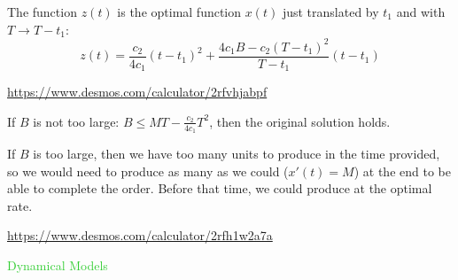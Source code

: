 \documentclass{workbook}
\begin{document}
\begin{solution}
\begin{slide}
\begin{parts}
	The function $z(t)$ is the optimal function $x(t)$ just translated by $t_1$ and with $T \to T-t_1$:
		\[ 
			z(t) = \frac{c_2}{4c_1} (t-t_1)^2 + \frac{4c_1 B-c_2 (T-t_1)^2}{T-t_1} (t-t_1)
		\]

	\url{https://www.desmos.com/calculator/2rfvhjabpf}
	
	\item If $B$ is not too large: $B\leq MT-\frac{c_{2}}{4c_{1}}T^{2}$, then the original solution holds.
		
		If $B$ is too large, then we have too many units to produce in the time provided, so we would need to produce as many as we could ($x'(t)=M$) at the end to be able to complete the order. 
		Before that time, we could produce at the optimal rate.

		\url{https://www.desmos.com/calculator/2rfh1w2a7a}
	
\end{parts}
\end{slide}
\end{solution}







%
%
%
%

\begin{slide}
\question

\begin{slidesonly}
	\vspace{3cm}
\end{slidesonly}

\begin{center}
\Huge 
\textcolor{LimeGreen}{Dynamical Models}
\end{center}

	
\end{slide}
\end{document}
